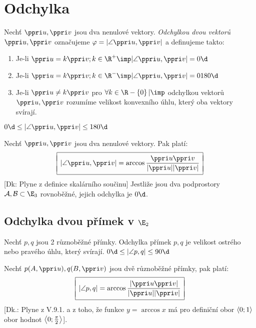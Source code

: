 
\def\mc{\mathcal}
\section{Odchylka}
\Def
Nechť $\ve u, \ve v$ jsou dva nenulové vektory. \emph{Odchylkou dvou vektorů} $\ve u, \ve v$ označujeme $\varphi = |\angle \ve u,\ve v|$ a definujeme takto:
\begin{enumerate}[1.]
	\item Je-li $\ve u = k \ve v ; k \in \R^+ \imp |\angle \ve u,\ve v| = 0\d$
	\item Je-li $\ve u = k \ve v ; k \in \R^- \imp |\angle \ve u,\ve v| = 0180\d$
	\item Je-li $\ve u \neq k \ve v$ pro $\forall k \in \R-\zs{0}| \imp $ odchylkou vektorů $\ve u , \ve v$ rozumíme velikost konvexního úhlu, který oba vektory svírají.
\end{enumerate}
\Poz $0\d \le | \angle \ve u , \ve v| \le 180\d$

\V Nechť $\ve u,\ve v$ jsou dva nenulové vektory. Pak platí:
$$
\begin{array}{|c|}\hline\\[-8px]
\displaystyle	|\angle\ve u , \ve v| = \arccos \f{\ve u \* \ve v}{|\ve u|\*|\ve v|}
	\\[-8px]\\\hline

\end{array}
$$
[Dk: Plyne z definice skalárního součinu] 
\Poz Jestliže jsou dva podprostory $\mc A, \mc B \subset \E_3$ rovnoběžné, jejich odchylka je $0\d$. 

\subsection{Odchylka dvou přímek v $\E_2$}
\Poz Nechť $p,q$ jsou 2 různoběžné přímky. Odchylka přímek $p,q$ je velikost ostrého nebo pravého úhlu, který svírají.
$0\d \le |\angle p,q| \le 90\d$

\V Nechť $p(A,\ve u),q(B,\ve v)$ jsou dvě různoběžné přímky, pak platí:
$$
\begin{array}{|c|}\hline\\[-8px]
\displaystyle	|\angle p,q| = \arccos \f{|\ve u \* \ve v|}{|\ve u|\*|\ve v|}
	\\[-8px]\\\hline

\end{array}
$$
[Dk.: Plyne z V.9.1. a z toho, že funkce $y = \arccos x$ má pro definiční obor $\<0;1\>$ obor hodnot $\<0;\f\pi2\>$].

